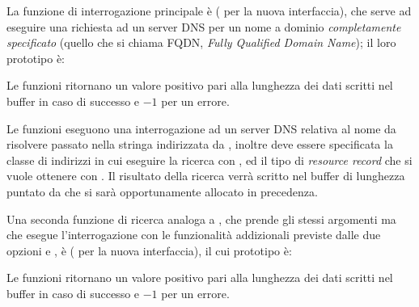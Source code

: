 La funzione di interrogazione principale è 
( per la nuova interfaccia), che serve ad eseguire una
richiesta ad un server DNS per un nome a dominio \textsl{completamente
  specificato} (quello che si chiama
 FQDN, \textit{Fully Qualified 
  Domain Name}); il loro prototipo è:

\begin{funcproto}{
}
{Le funzioni ritornano un valore positivo pari alla lunghezza dei dati scritti
  nel buffer  in caso di successo e $-1$ per un errore.
}
\end{funcproto}

Le funzioni eseguono una interrogazione ad un server DNS relativa al nome da
risolvere passato nella stringa indirizzata da , inoltre deve
essere specificata la classe di indirizzi in cui eseguire la ricerca con
, ed il tipo di \textit{resource record} che si vuole ottenere
con . Il risultato della ricerca verrà scritto nel buffer di
lunghezza  puntato da  che si sarà opportunamente
allocato in precedenza.

Una seconda funzione di ricerca analoga a , che prende gli
stessi argomenti ma che esegue l'interrogazione con le funzionalità
addizionali previste dalle due opzioni  e
, è  ( per la nuova
interfaccia), il cui prototipo è:

\begin{funcproto}{
}
{Le funzioni ritornano un valore positivo pari alla lunghezza dei dati scritti
  nel buffer  in caso di successo e $-1$ per un errore.
}
\end{funcproto}

